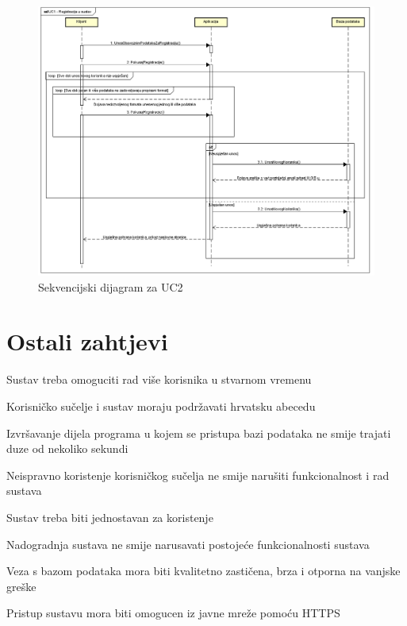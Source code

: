 				\begin{figure}[H]
					\includegraphics[scale=0.6]{dijagrami/SDRegistracija.PNG}
					\centering
					\caption{Sekvencijski dijagram za UC2}
					\label{fig:myChart}
				\end{figure}
	
		\section{Ostali zahtjevi}
			\begin{packed_item}
			\item	Sustav treba omoguciti rad više korisnika u stvarnom vremenu
			\item	Korisničko sučelje i sustav moraju podržavati hrvatsku abecedu
			\item	Izvršavanje dijela programa u kojem se pristupa bazi podataka ne smije trajati duze od nekoliko sekundi
			\item	Neispravno koristenje korisničkog sučelja ne smije narušiti funkcionalnost i rad sustava
			\item	Sustav treba biti jednostavan za koristenje
			\item	Nadogradnja sustava ne smije narusavati postojeće funkcionalnosti sustava
			\item	Veza s bazom podataka mora biti kvalitetno zastičena, brza i otporna na vanjske greške
			\item	Pristup sustavu mora biti omogucen iz javne mreže pomoću HTTPS
			\end{packed_item}
			 
			 
			 
	
